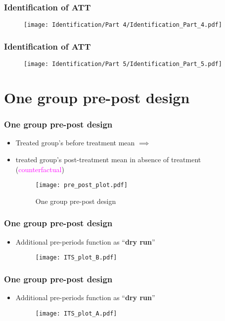\documentclass[table, xcolor = {dvipsnames}, 9pt]{beamer}
\theoremstyle{plain}
\begin{document}
\begin{frame}[t]
\frametitle{Identification of ATT}
\vfill
\begin{figure}
\texttt{[image: Identification/Part 4/Identification\_Part\_4.pdf]}
\end{figure}
\vfill
\end{frame}
\begin{frame}[t]
\frametitle{Identification of ATT}
\vfill
\begin{figure}
\texttt{[image: Identification/Part 5/Identification\_Part\_5.pdf]}
\end{figure}
\vfill
\end{frame}
\section{One group pre-post design}
\begin{frame}[t]
\frametitle{One group pre-post design}
\vfill
\begin{itemize} \vfill
\item Treated group's before treatment mean $\implies$
\item[] treated group's post-treatment mean in absence of treatment \\ (\textcolor{magenta}{counterfactual})
\begin{figure}
\texttt{[image: pre\_post\_plot.pdf]}
\caption{One group pre-post design \citep[][p.~108-110]{shadishetal2002}}
\end{figure} \vfill
\end{itemize} \vfill
\end{frame}
\begin{frame}[t]
\frametitle{One group pre-post design}
\vfill
\begin{itemize} \vfill
\item Additional pre-periods function as ``\textbf{dry run}''
\begin{figure}
\texttt{[image: ITS\_plot\_B.pdf]}
\end{figure} \vfill
\end{itemize} \vfill
\end{frame}
\begin{frame}[t]
\frametitle{One group pre-post design}
\vfill
\begin{itemize} \vfill
\item Additional pre-periods function as ``\textbf{dry run}''
\begin{figure}
\texttt{[image: ITS\_plot\_A.pdf]}
\end{figure} \vfill
\end{itemize} \vfill
\end{frame}
\end{document}
